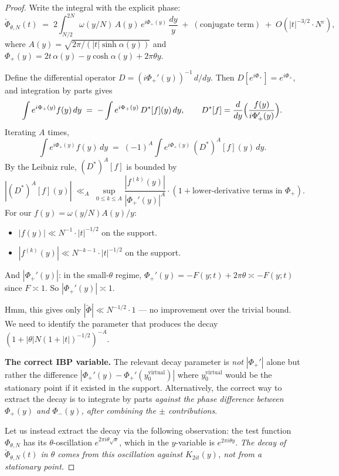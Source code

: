 \documentclass[11pt]{article}
\theoremstyle{definition}
\begin{document}
\begin{proof}
Write the integral with the explicit phase:
\[
    \check\Phi_{\theta,N}(t) \;=\; 2\int_{N/2}^{2N}\omega(y/N)\, A(y)\,e^{i\Phi_+(y)}\,\frac{dy}{y}\;+\;(\text{conjugate term})\;+\;O(|t|^{-3/2}\cdot N^\varepsilon),
\]
where $A(y) = \sqrt{2\pi/(|t|\sinh\alpha(y))}$ and $\Phi_+(y) = 2t\,\alpha(y) - y\cosh\alpha(y) + 2\pi\theta y$.

Define the differential operator $D = (i\Phi_+'(y))^{-1}\,d/dy$. Then $D[e^{i\Phi_+}] = e^{i\Phi_+}$, and integration by parts gives
\[
   \int e^{i\Phi_+(y)}f(y)\,dy \;=\; -\int e^{i\Phi_+(y)}\,D^*[f](y)\,dy,\qquad D^*[f] = \frac{d}{dy}\Bigl(\frac{f(y)}{i\Phi_+'(y)}\Bigr).
\]
Iterating $A$ times,
\[
   \int e^{i\Phi_+(y)}f(y)\,dy \;=\; (-1)^A\int e^{i\Phi_+(y)}\,(D^*)^A[f](y)\,dy.
\]
By the Leibniz rule, $(D^*)^A[f]$ is bounded by
\[
   |(D^*)^A[f](y)| \;\ll_A\; \sup_{0 \le k \le A} \frac{|f^{(k)}(y)|}{|\Phi_+'(y)|^A} \cdot (1 + \text{lower-derivative terms in }\Phi_+).
\]
For our $f(y) = \omega(y/N)A(y)/y$:
\begin{itemize}
   \item $|f(y)| \ll N^{-1}\cdot|t|^{-1/2}$ on the support.
   \item $|f^{(k)}(y)| \ll N^{-k-1}\cdot|t|^{-1/2}$ on the support.
\end{itemize}
And $|\Phi_+'(y)|$: in the small-$\theta$ regime, $\Phi_+'(y) = -F(y;t) + 2\pi\theta \asymp -F(y;t)$ since $F \asymp 1$. So $|\Phi_+'(y)| \asymp 1$.

Hmm, this gives only $|\check\Phi| \ll N^{-1/2}\cdot 1$ — no improvement over the trivial bound. We need to identify the parameter that produces the decay $(1+|\theta|N(1+|t|)^{-1/2})^{-A}$.

\textbf{The correct IBP variable.}
The relevant decay parameter is \emph{not} $|\Phi_+'|$ alone but rather the difference $|\Phi_+'(y) - \Phi_+'(y_0^{\mathrm{virtual}})|$ where $y_0^{\mathrm{virtual}}$ would be the stationary point if it existed in the support. Alternatively, the correct way to extract the decay is to integrate by parts \emph{against the phase difference between $\Phi_+(y)$ and $\Phi_-(y)$, after combining the $\pm$ contributions}.

Let us instead extract the decay via the following observation: the test function $\Phi_{\theta,N}$ has its $\theta$-oscillation $e^{2\pi i\theta\sqrt x}$, which in the $y$-variable is $e^{2\pi i\theta y}$. \emph{The decay of $\check\Phi_{\theta,N}(t)$ in $\theta$ comes from this oscillation against $K_{2it}(y)$, not from a stationary point.}


\end{proof}
\end{document}
